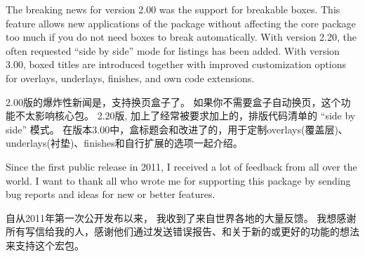 The breaking news for version 2.00 was the support for breakable boxes.%
This feature allows new applications of the package without affecting the core package too much if you do not need boxes to break automatically.%
With version 2.20, the often requested \enquote{side by side} mode for listings has been added.%
With version 3.00, boxed titles are introduced together with improved customization options for overlays, underlays, finishes, and own code extensions.%

2.00版的爆炸性新闻是，支持换页盒子了。%
如果你不需要盒子自动换页，这个功能不太影响核心包。%
2.20版, 加上了经常被要求加上的，排版代码清单的 \enquote{side by side} 模式。%
在版本3.00中，盒标题会和改进了的，用于定制overlays(覆盖层)、underlays(衬垫)、finishes和自行扩展的选项一起介绍。


\begin{tcolorbox}[enhanced,%
boxrule=0mm,boxsep=0mm,%
frame hidden,interior hidden,%
left=0mm,right=0mm,top=0mm,bottom=0mm,%
watermark opacity=0.25,watermark zoom=1.2,%
before=\par\smallskip,%
clip watermark=false,%
watermark tikz={%
\path[fill=yellow,draw=yellow!75!red] (0,0) circle (1cm);%
\fill[red] (45:5mm) circle (1mm);\fill[red] (135:5mm) circle (1mm);%
\draw[line width=1mm,red] (215:5mm) arc (215:325:5mm);}]%
Since the first public release in 2011, %
I received a lot of feedback from all over the world.%
I want to thank all who wrote me for supporting this package by sending bug reports and ideas for new or better features.

自从2011年第一次公开发布以来，%
我收到了来自世界各地的大量反馈。%
我想感谢所有写信给我的人，感谢他们通过发送错误报告、和关于新的或更好的功能的想法来支持这个宏包。
\end{tcolorbox}
    